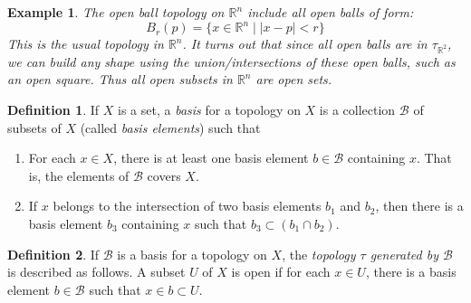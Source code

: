 \documentclass{article}
\newtheorem{example}{Example}[section]
\theoremstyle{remark}
\theoremstyle{definition}
\newtheorem{definition}{Definition}[section]
\begin{document}
\begin{example}
The \textit{open ball topology} on $\mathbb{R}^{n}$ include all open balls of form: 
\[ B_{r}(p) = \{ x \in \mathbb{R}^{n} \; | \; |x-p| < r \} \]
This is the usual topology in $\mathbb{R}^{n}$. It turns out that since all open balls are in $\tau_{\mathbb{R}^{2}}$, we can build any shape using the union/intersections of these open balls, such as an open square. Thus all open subsets in $\mathbb{R}^{n}$ are open sets. 
\end{example}

\begin{definition}
If $X$ is a set, a \textit{basis} for a topology on $X$ is a collection $\mathscr{B}$ of subsets of $X$ (called \textit{basis elements}) such that
\begin{enumerate}
    \item For each $x \in X$, there is at least one basis element $b \in \mathscr{B}$ containing $x$. That is, the elements of $\mathscr{B}$ covers $X$. 
    \item If $x$ belongs to the intersection of two basis elements $b_1$ and $b_2$, then there is a basis element $b_3$ containing $x$ such that $b_3 \subset (b_1 \cap b_2)$. 
\end{enumerate}
\begin{center}
\end{center}
\end{definition}

\begin{definition}
If $\mathscr{B}$ is a basis for a topology on $X$, the \textit{topology $\tau$ generated by $\mathscr{B}$} is described as follows. A subset $U$ of $X$ is open if for each $x \in U$, there is a basis element $b \in \mathscr{B}$ such that $x \in b \subset U$. 
\end{definition}
\begin{center}
\end{center}
\end{document}
